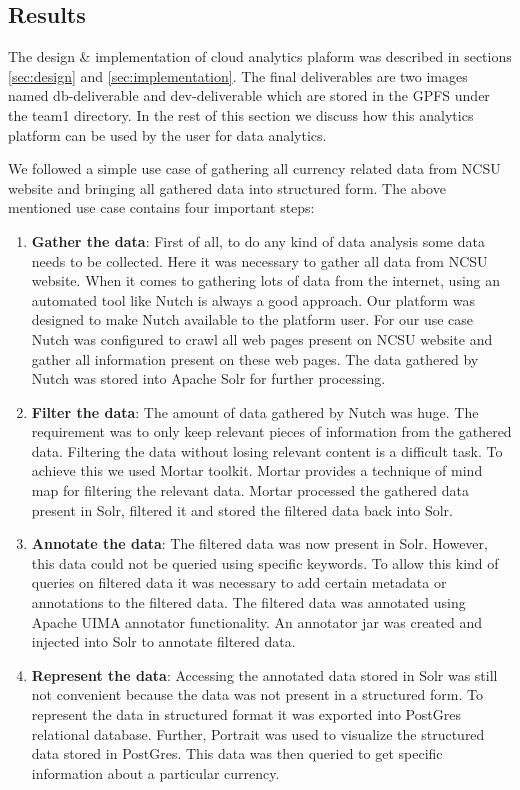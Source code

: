 \subsection{Results}
\label{sec:results}
The design \& implementation of cloud analytics plaform was described
in sections \ref{sec:design} and \ref{sec:implementation}. The final
deliverables are two images named db-deliverable and dev-deliverable
which are stored in the GPFS under the team1 directory. In the rest of 
this section we discuss how this analytics platform can be used by the
user for data analytics.

We followed a simple use case of gathering all currency related data
from NCSU website and bringing all gathered data into structured form.
The above mentioned use case contains four important steps:
\begin{enumerate}
  \item \textbf{Gather the data}: First of all, to do any kind of data analysis
    some data needs to be collected. Here it was necessary to gather
    all data from NCSU website. When it comes to gathering lots of
    data from the internet, using an automated tool like Nutch is
    always a good approach. Our platform was designed to make Nutch
    available to the platform user. For our use case Nutch was configured
    to crawl all web pages present on NCSU website and gather all
    information present on these web pages. The data gathered by Nutch
    was stored into Apache Solr for further processing.
  \item \textbf{Filter the data}: The amount of data gathered by Nutch was
    huge. The requirement was to only keep relevant pieces of information
    from the gathered data. Filtering the data without losing relevant
    content is a difficult task. To achieve this we used Mortar
    toolkit. Mortar provides a technique of mind map for filtering the relevant
    data. Mortar processed the gathered data present in Solr, filtered
    it and stored the filtered data back into Solr.
  \item \textbf{Annotate the data}: The filtered data was now present in
    Solr. However, this data could not be queried using specific
    keywords. To allow this kind of queries on filtered data it was
    necessary to add certain metadata or annotations to the filtered data.
    The filtered data was annotated using Apache UIMA annotator
    functionality. An annotator jar was created and injected into Solr to annotate
    filtered data.
  \item \textbf{Represent the data}: Accessing the annotated data stored in
    Solr was still not convenient because the data was not present in
    a structured form. To represent the data in structured format it was exported
    into PostGres relational database. Further, Portrait was used to
    visualize the structured data stored in PostGres. This data was
    then queried to get specific information about a particular currency.
\end{enumerate}


